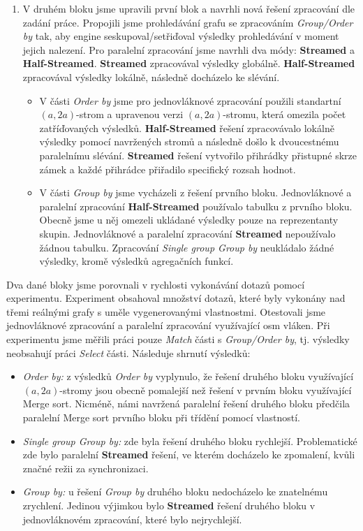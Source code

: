 \begin{enumerate}
\item
V druhém bloku jsme upravili první blok a navrhli nová řešení zpracování dle zadání práce.
Propojili jsme prohledávání grafu se zpracováním \textit{Group/Order by} tak, aby engine seskupoval/setřiďoval výsledky prohledávání v moment jejich nalezení.
Pro paralelní zpracování jsme navrhli dva módy: \textbf{Streamed} a \textbf{Half-Streamed}.
\textbf{Streamed} zpracovával výsledky globálně.
\textbf{Half-Streamed} zpracovával výsledky lokálně, následně docházelo ke slévání.
\begin{itemize}
\item V části \textit{Order by} jsme pro jednovláknové zpracování použili standartní $(a, 2a)$-strom a upravenou verzi $(a, 2a)$-stromu, která omezila počet zatříďovaných výsledků.  
\textbf{Half-Streamed} řešení zpracovávalo lokálně výsledky pomocí navržených stromů a následně došlo k dvoucestnému paralelnímu slévání.
\textbf{Streamed} řešení vytvořilo přihrádky přistupné skrze zámek a každé přihrádce přiřadilo specifický rozsah hodnot.
\item
V části \textit{Group by} jsme vycházeli z řešení prvního bloku.
Jednovláknové a paralelní zpracování \textbf{Half-Streamed} používalo tabulku z prvního bloku.
Obecně jsme u něj omezeli ukládané výsledky pouze na reprezentanty skupin.
Jednovláknové a paralelní zpracování \textbf{Streamed} nepoužívalo žádnou tabulku.
Zpracování \textit{Single group Group by} neukládalo žádné výsledky, kromě výsledků agregačních funkcí.
\end{itemize}
\end{enumerate}

Dva dané bloky jsme porovnali v rychlosti vykonávání dotazů pomocí experimentu.
Experiment obsahoval množství dotazů, které byly vykonány nad třemi reálnými grafy s uměle vygenerovanými vlastnostmi.
Otestovali jsme jednovláknové zpracování a paralelní zpracování využívající osm vláken.
Při experimentu jsme měřili práci pouze \textit{Match} části s \textit{Group/Order by}, tj. výsledky neobsahují práci \textit{Select} části.
Následuje shrnutí výsledků:
\begin{itemize}

\item \textit{Order by:} z výsledků \textit{Order by} vyplynulo, že řešení druhého bloku využívající $(a, 2a)$-stromy jsou obecně pomalejší než řešení v prvním bloku využívající Merge sort.
Nicméně, námi navržená paralelní řešení druhého bloku předčila paralelní Merge sort prvního bloku při třídění pomocí vlastností.

\item \textit{Single group Group by:} zde byla řešení druhého bloku rychlejší.
Problematické zde bylo paralelní \textbf{Streamed} řešení, ve kterém docházelo ke zpomalení, kvůli značné režii za synchronizaci.

\item \textit{Group by:} u řešení \textit{Group by} druhého bloku nedocházelo ke znatelnému zrychlení.
Jedinou výjimkou bylo \textbf{Streamed} řešení druhého bloku v jednovláknovém zpracování, které bylo nejrychlejší.

\end{itemize}

